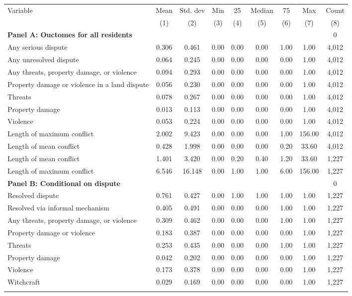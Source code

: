 \begin{tabular}{lcccccccc}
\hline \noalign{\smallskip}Variable & Mean & Std. dev & Min & 25 & Median & 75 & Max & Count\\
 & (1) & (2) & (3) & (4) & (5) & (6) & (7) & (8)\\
\noalign{\smallskip}\hline \noalign{\smallskip}\textbf{Panel A: Ouctomes for all residents} &  &  &  &  &  &  &  & 0\\
Any serious dispute & 0.306 & 0.461 & 0.00 & 0.00 & 0.00 & 1.00 & 1.00 & 4,012\\
Any unresolved dispute & 0.064 & 0.245 & 0.00 & 0.00 & 0.00 & 0.00 & 1.00 & 4,012\\
\phantom{} Any threats, property damage, or violence & 0.094 & 0.293 & 0.00 & 0.00 & 0.00 & 0.00 & 1.00 & 4,012\\
\quad Property damage or violence in a land dispute & 0.056 & 0.230 & 0.00 & 0.00 & 0.00 & 0.00 & 1.00 & 4,012\\
\quad Threats & 0.078 & 0.267 & 0.00 & 0.00 & 0.00 & 0.00 & 1.00 & 4,012\\
\quad Property damage & 0.013 & 0.113 & 0.00 & 0.00 & 0.00 & 0.00 & 1.00 & 4,012\\
\quad Violence & 0.053 & 0.224 & 0.00 & 0.00 & 0.00 & 0.00 & 1.00 & 4,012\\
Length of maximum conflict & 2.002 & 9.423 & 0.00 & 0.00 & 0.00 & 1.00 & 156.00 & 4,012\\
\quad Length of mean conflict & 0.428 & 1.998 & 0.00 & 0.00 & 0.00 & 0.20 & 33.60 & 4,012\\
\quad Length of mean conflict \phantom{} & 1.401 & 3.420 & 0.00 & 0.20 & 0.40 & 1.20 & 33.60 & 1,227\\
Length of maximum conflict \phantom{} & 6.546 & 16.148 & 0.00 & 1.00 & 1.00 & 6.00 & 156.00 & 1,227\\
\textbf{Panel B: Conditional on dispute} &  &  &  &  &  &  &  & 0\\
Resolved dispute & 0.761 & 0.427 & 0.00 & 1.00 & 1.00 & 1.00 & 1.00 & 1,227\\
\quad Resolved via informal mechanism & 0.405 & 0.491 & 0.00 & 0.00 & 0.00 & 1.00 & 1.00 & 1,227\\
\phantom{} Any threats, property damage, or violence \phantom{} & 0.309 & 0.462 & 0.00 & 0.00 & 0.00 & 1.00 & 1.00 & 1,227\\
\quad Property damage or violence \phantom{} & 0.183 & 0.387 & 0.00 & 0.00 & 0.00 & 0.00 & 1.00 & 1,227\\
\quad Threats \phantom{} & 0.253 & 0.435 & 0.00 & 0.00 & 0.00 & 1.00 & 1.00 & 1,227\\
\quad Property damage \phantom{} & 0.042 & 0.202 & 0.00 & 0.00 & 0.00 & 0.00 & 1.00 & 1,227\\
\quad Violence \phantom{} & 0.173 & 0.378 & 0.00 & 0.00 & 0.00 & 0.00 & 1.00 & 1,227\\
\quad Witchcraft \phantom{} & 0.029 & 0.169 & 0.00 & 0.00 & 0.00 & 0.00 & 1.00 & 1,227\\
\noalign{\smallskip}\hline\end{tabular}
